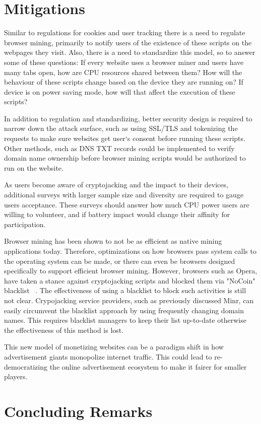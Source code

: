 
\section{Mitigations}

Similar to regulations for cookies and user tracking there is a need to regulate browser mining, primarily to notify users of the existence of these scripts on the webpages they visit. Also, there is a need to standardize this model, so to answer some of these questions: If every website uses a browser miner and users have many tabs open, how are CPU resources shared between them? How will the behaviour of these scripts change based on the device they are running on? If device is on power saving mode, how will that affect the execution of these scripts?

In addition to regulation and standardizing, better security design is required to narrow down the attack surface, such as using SSL/TLS and tokenizing the requests to make sure websites get user`s consent before running these scripts. Other methods, such as DNS TXT records could be implemented to verify domain name ownership before browser mining scripts would be authorized to run on the website.


As users become aware of cryptojacking and the impact to their devices, additional surveys with larger sample size and diversity are required to gauge users acceptance. These surveys should answer how much CPU power users are willing to volunteer, and if battery impact would change their affinity for participation.

Browser mining has been shown to not be as efficient as native mining applications today. Therefore, optimizations on how browsers pass system calls to the operating system can be made, or there can even be browsers designed specifically to support efficient browser mining. However, browsers such as Opera, have taken a stance against cryptojacking scripts and blocked them via "NoCoin" blacklist ~\cite{operanocoin}. The effectiveness of using a blacklist to block such activities is still not clear. Crypojacking service providers, such as previously discussed Minr, can easily circumvent the blacklist approach by using frequently changing domain names. This requires blacklist managers to keep their list up-to-date otherwise the effectiveness of this method is lost.


This new model of monetizing websites can be a paradigm shift in how advertisement giants monopolize internet traffic. This could lead to re-democratizing the online advertisement ecosystem to make it fairer for smaller players.


\section{Concluding Remarks}




















